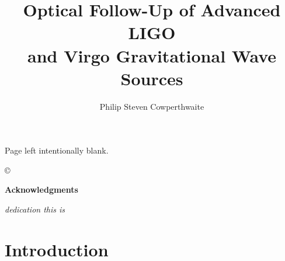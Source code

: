 \documentclass[bound]{hvdthesis}
\author{Philip Steven Cowperthwaite}
\title{Optical Follow-Up of Advanced LIGO \\ 
and Virgo Gravitational Wave Sources}
\begin{document}
% 

\clearpage
\thispagestyle{empty}
\begin{center}
\vspace*{\fill}
Page left intentionally blank.
\vspace*{\fill}
\end{center}

\frontmatter

\makecover
\copyright

%
{\singlespace
\tableofcontents
}
\newpage
\clearpage


\newpage
%
\thispagestyle{plain}

\vskip 0.5cm
{\centerline {\Large \bf Acknowledgments}}
\vskip 0.5cm
\normalsize




\clearpage
%
\thispagestyle{plain}

\vspace*{\fill}
{\centerline {\em dedication this is}}
\vspace*{\fill}


\mainmatter
\pagestyle{fancy}


%
%

\chapter[Introduction]{Introduction}\label{c:intro}

\clearpage
%
\end{document}
